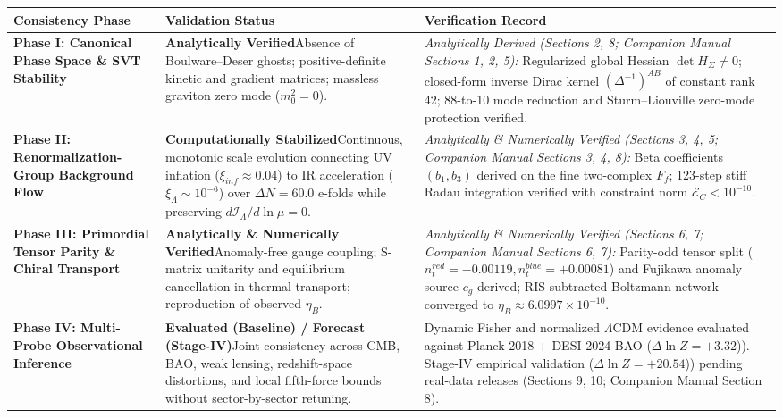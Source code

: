 \documentclass[aps,prd,onecolumn,superscriptaddress,nofootinbib,longbibliography,10pt]{revtex4-2}
\begin{document}
  
\begin{center}
\begin{tabular}{|lll|}
\hline

      Consistency Phase & Validation Status & Verification Record
       \\ \hline

    
    
      
        \textbf{Phase I: Canonical Phase Space \& SVT Stability} & \textbf{Analytically Verified}Absence of Boulware–Deser ghosts; positive-definite kinetic and gradient matrices; massless graviton zero mode (\(m_0^2 = 0\)). & \textit{Analytically Derived (Sections 2, 8; Companion Manual Sections 1, 2, 5):} Regularized global Hessian \(\det H_\Sigma \neq 0\); closed-form inverse Dirac kernel \((\Delta^{-1})^{AB}\) of constant rank 42; 88-to-10 mode reduction and Sturm–Liouville zero-mode protection verified.
       \\ \hline

      
        \textbf{Phase II: Renormalization-Group Background Flow} & \textbf{Computationally Stabilized}Continuous, monotonic scale evolution connecting UV inflation (\(\xi_{inf} \approx 0.04\)) to IR acceleration (\(\xi_\Lambda \sim 10^{-6}\)) over \(\Delta N = 60.0\) e-folds while preserving \(d\mathcal{I}_\Lambda/d\ln\mu = 0\). & \textit{Analytically \& Numerically Verified (Sections 3, 4, 5; Companion Manual Sections 3, 4, 8):} Beta coefficients \((b_1, b_3)\) derived on the fine two-complex \(F_f\); 123-step stiff Radau integration verified with constraint norm \(\mathcal{E}_C < 10^{-10}\).
       \\ \hline

      
        \textbf{Phase III: Primordial Tensor Parity \& Chiral Transport} & \textbf{Analytically \& Numerically Verified}Anomaly-free gauge coupling; S-matrix unitarity and equilibrium cancellation in thermal transport; reproduction of observed \(\eta_B\). & \textit{Analytically \& Numerically Verified (Sections 6, 7; Companion Manual Sections 6, 7):} Parity-odd tensor split (\(n_t^{red} = -0.00119, n_t^{blue} = +0.00081\)) and Fujikawa anomaly source \(c_g\) derived; RIS-subtracted Boltzmann network converged to \(\eta_B \approx 6.0997 \times 10^{-10}\).
       \\ \hline

      
        \textbf{Phase IV: Multi-Probe Observational Inference} & \textbf{Evaluated (Baseline) / Forecast (Stage-IV)}Joint consistency across CMB, BAO, weak lensing, redshift-space distortions, and local fifth-force bounds without sector-by-sector retuning. & Dynamic Fisher and normalized $\Lambda$CDM evidence evaluated against Planck 2018 + DESI 2024 BAO (\(\Delta \ln Z = +3.32\))). Stage-IV empirical validation (\(\Delta \ln Z = +20.54\))) pending real-data releases (Sections 9, 10; Companion Manual Section 8).
       \\ \hline

    
  \end{tabular}
\end{center}
\end{document}
